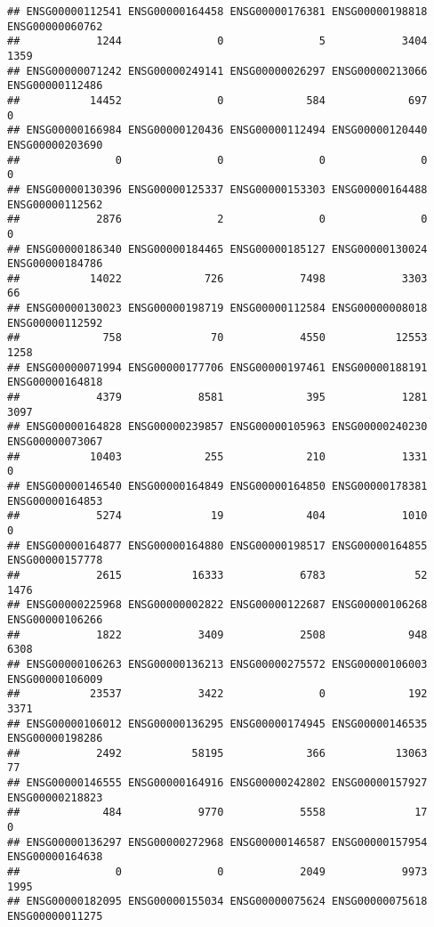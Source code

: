 \documentclass[
]{article}
\begin{document}
\begin{verbatim}
## ENSG00000112541 ENSG00000164458 ENSG00000176381 ENSG00000198818 ENSG00000060762 
##            1244               0               5            3404            1359 
## ENSG00000071242 ENSG00000249141 ENSG00000026297 ENSG00000213066 ENSG00000112486 
##           14452               0             584             697               0 
## ENSG00000166984 ENSG00000120436 ENSG00000112494 ENSG00000120440 ENSG00000203690 
##               0               0               0               0               0 
## ENSG00000130396 ENSG00000125337 ENSG00000153303 ENSG00000164488 ENSG00000112562 
##            2876               2               0               0               0 
## ENSG00000186340 ENSG00000184465 ENSG00000185127 ENSG00000130024 ENSG00000184786 
##           14022             726            7498            3303              66 
## ENSG00000130023 ENSG00000198719 ENSG00000112584 ENSG00000008018 ENSG00000112592 
##             758              70            4550           12553            1258 
## ENSG00000071994 ENSG00000177706 ENSG00000197461 ENSG00000188191 ENSG00000164818 
##            4379            8581             395            1281            3097 
## ENSG00000164828 ENSG00000239857 ENSG00000105963 ENSG00000240230 ENSG00000073067 
##           10403             255             210            1331               0 
## ENSG00000146540 ENSG00000164849 ENSG00000164850 ENSG00000178381 ENSG00000164853 
##            5274              19             404            1010               0 
## ENSG00000164877 ENSG00000164880 ENSG00000198517 ENSG00000164855 ENSG00000157778 
##            2615           16333            6783              52            1476 
## ENSG00000225968 ENSG00000002822 ENSG00000122687 ENSG00000106268 ENSG00000106266 
##            1822            3409            2508             948            6308 
## ENSG00000106263 ENSG00000136213 ENSG00000275572 ENSG00000106003 ENSG00000106009 
##           23537            3422               0             192            3371 
## ENSG00000106012 ENSG00000136295 ENSG00000174945 ENSG00000146535 ENSG00000198286 
##            2492           58195             366           13063              77 
## ENSG00000146555 ENSG00000164916 ENSG00000242802 ENSG00000157927 ENSG00000218823 
##             484            9770            5558              17               0 
## ENSG00000136297 ENSG00000272968 ENSG00000146587 ENSG00000157954 ENSG00000164638 
##               0               0            2049            9973            1995 
## ENSG00000182095 ENSG00000155034 ENSG00000075624 ENSG00000075618 ENSG00000011275 

\end{verbatim}
\end{document}
